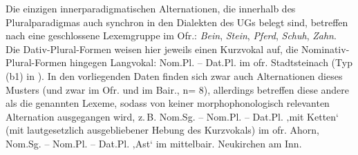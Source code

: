 Die einzigen innerparadigmatischen Alternationen, die innerhalb des Pluralparadigmas auch synchron in den Dialekten des UGs belegt sind, betreffen nach \citet[143]{Rowley1997} eine geschlossene Lexemgruppe im Ofr.: \textit{Bein}, \textit{Stein}, \textit{Pferd}, \textit{Schuh}, \textit{Zahn}. Die Dativ-Plural-Formen weisen hier jeweils einen Kurzvokal auf, die Nominativ-Plural-Formen hingegen Langvokal: Nom.Pl.  -- Dat.Pl.  im ofr. Stadtsteinach (Typ (b1) in 	). In den vorliegenden Daten finden sich zwar auch Alternationen dieses Musters (und zwar im Ofr. und im Bair., n= 8), allerdings betreffen diese andere als die genannten Lexeme, sodass von keiner morphophonologisch relevanten Alternation ausgegangen wird, z.\,B. Nom.Sg.   -- Nom.Pl.  -- Dat.Pl.   ‚mit Ketten‘ (mit lautgesetzlich ausgebliebener Hebung des Kurzvokals) im ofr. Ahorn, Nom.Sg.    -- Nom.Pl.    -- Dat.Pl.    ‚Ast‘ im mittelbair. Neukirchen am Inn.

